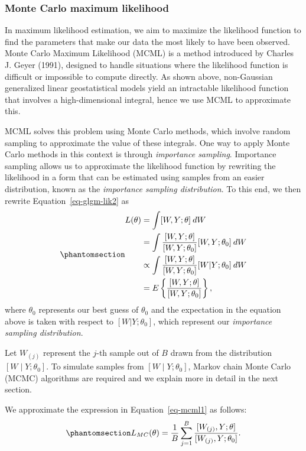 \documentclass[
  letterpaper,
]{krantz}
\begin{document}
\subsubsection{Monte Carlo maximum likelihood}\label{sec-mcml}

In maximum likelihood estimation, we aim to maximize the likelihood
function to find the parameters that make our data the most likely to
have been observed. Monte Carlo Maximum Likelihood (MCML) is a method
introduced by Charles J. Geyer (1991), designed to handle situations
where the likelihood function is difficult or impossible to compute
directly. As shown above, non-Gaussian generalized linear geostatistical
models yield an intractable likelihood function that involves a
high-dimensional integral, hence we use MCML to approximate this.

MCML solves this problem using Monte Carlo methods, which involve random
sampling to approximate the value of these integrals. One way to apply
Monte Carlo methods in this context is through \emph{importance
sampling}. Importance sampling allows us to approximate the likelihood
function by rewriting the likelihood in a form that can be estimated
using samples from an easier distribution, known as the \emph{importance
sampling distribution}. To this end, we then rewrite
Equation~\ref{eq-glgm-lik2} as
\begin{equation}\phantomsection\label{eq-mcml1}{
\begin{aligned}
L(\theta) 
&= \int [W, Y; \theta] \: dW  \\
&= \int \frac{[W, Y; \theta]}{[W, Y; \theta_0]}[W, Y; \theta_0]\: dW   \\
&\propto  \int \frac{[W, Y; \theta]}{[W, Y; \theta_0]} [W | Y; \theta_0] \: dW  \\
&= E\left\{\frac{[W, Y; \theta]}{[W, Y; \theta_0]}\right\},
\end{aligned} 
}\end{equation} where \(\theta_0\) represents our best guess of
\(\theta_0\) and the expectation in the equation above is taken with
respect to \([W | Y; \theta_0]\), which represent our \emph{importance
sampling distribution}.

Let \(W_{(j)}\) represent the \(j\)-th sample out of \(B\) drawn from
the distribution \([W \mid Y; \theta_0]\). To simulate samples from
\([W \mid Y; \theta_0]\), Markov chain Monte Carlo (MCMC) algorithms are
required and we explain more in detail in the next section.

We approximate the expression in Equation~\ref{eq-mcml1} as follows:
\begin{equation}\phantomsection\label{eq-mcml2}{
L_{MC}(\theta) = \frac{1}{B} \sum_{j=1}^B \frac{[W_{(j)}, Y; \theta]}{[W_{(j)}, Y; \theta_0]}.
}\end{equation}
\end{document}
